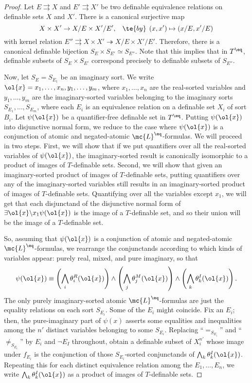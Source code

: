 \documentclass[11pt]{article}
\begin{document}
\begin{proof}
  Let $E \rightrightarrows X$ and $E' \rightrightarrows X'$ be two definable equivalence relations on definable sets $X$ and $X'$. There is a canonical surjective map
  $$
X \times X' \to X/E \times X'/E', \hspace{3mm} \te{ by } \hspace{1.5mm} (x, x') \mapsto (x/E, x'/E)
  $$
  with kernel relation $E'' \rightrightarrows X \times X' \twoheadrightarrow X/E \times X'/E'$. Therefore, there is a canonical definable bijection $S_E \times S_{E'} \simeq S_{E''}$. Note that this implies that in $T^{\eq}$, definable subsets of $S_E \times S_{E'}$ correspond precisely to definable subsets of $S_{E''}$.

Now, let $S_E = S_{E_1}$ be an imaginary sort. We write $\ol{x} = x_1, \dots, x_n, y_1, \dots, y_m$, where $x_1, \dots, x_n$ are the real-sorted variables and $y_1, \dots, y_m$ are the imaginary-sorted variables belonging to the imaginary sorts $S_{E_1}, \dots, S_{E_m}$, where each $E_i$ is an equivalence relation on a definable set $X_i$ of sort $B_i$.  Let $\psi(\ol{x})$ be a quantifier-free definable set in $T^{\eq}$. Putting $\psi(\ol{x})$ into disjunctive normal form, we reduce to the case where $\psi(\ol{x})$ is a conjunction of atomic and negated-atomic $\mc{L}^{\eq}$-formulas. We will proceed in two steps. First, we will show that if we put quantifiers over all the real-sorted variables of $\psi(\ol{x})$, the imaginary-sorted result is canonically isomorphic to a product of images of $T$-definable sets. Second, we will show that given an imaginary-sorted product of images of $T$-definable sets, putting quantifiers over any of the imaginary-sorted variables still results in an imaginary-sorted product of images of $T$-definable sets. Quantifying over all the variables except $x_1$, we will get that each disjunctand of the disjunctive normal form of $\exists \ol{x} \backslash x_1 \psi(\ol{x})$ is the image of a $T$-definable set, and so their union will be the image of a $T$-definable set.

So, assuming that $\psi(\ol{x})$ is a conjunction of atomic and negated-atomic $\mc{L}^{\eq}$-formulas, we rearrange the conjunctands according to which kinds of variables appear: purely real, mixed, and pure imaginary, so that
$$
\psi(\ol{x}) \equiv \left(\bigwedge_i \theta_i^R(\ol{x})\right) \land \left(\bigwedge_j \theta_j^M(\ol{x})\right) \land \left(\bigwedge_k \theta_k^I(\ol{x})\right).
$$
The only purely imaginary-sorted atomic $\mc{L}^{\eq}$-formulas are just the equality relations on each sort $S_{E_i}$. Some of the $E_i$ might coincide. Fix an $E_i$; then, the pure-imaginary part of $\psi(x)$ asserts some equalities and inequalities among the $n'$ distinct variables belonging to some $S_{E_i}$. Replacing ``$=_{S_{E_i}}$'' and ``$\neq_{S_{E_i}}$'' by $E_i$ and $\neg E_I$ throughout, obtain a definable subset of $X_i^{n'}$ whose image under $f_{E_i}$ is the conjunction of those $S_{E_i}$-sorted conjunctands of $\bigwedge_k \theta^I_k(\ol{x})$. Repeating this for each distinct equivalence relation among the $E_1, \dots, E_n$, we write $\bigwedge_k \theta^I_k(\ol{x})$ as a product of images of $T$-definable sets.


\end{proof}
\end{document}
